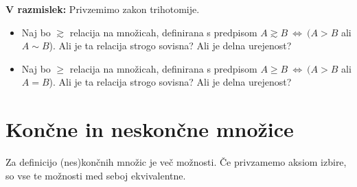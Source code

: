 \documentclass[11pt,paper=b5,footinclude,headinclude]{scrbook} %
\def\cee {{~\Leftrightarrow~}}
\begin{document}
\textbf{V razmislek:}
Privzemimo zakon trihotomije.
\begin{itemize}
    \item Naj bo $\gtrsim$ relacija na množicah, definirana s predpisom $A\gtrsim B\cee (A>B$ ali $A\sim B$).
     Ali je ta relacija strogo sovisna? Ali je delna urejenost?

    \item Naj bo $\ge$ relacija na množicah, definirana s predpisom $A\ge B\cee (A>B$ ali $A= B$).
     Ali je ta relacija strogo sovisna? Ali je delna urejenost?
\end{itemize}

\chapter{Končne in neskončne množice}

Za definicijo (nes)končnih množic je več možnosti. Če privzamemo aksiom izbire, so vse te možnosti med seboj ekvivalentne.
\end{document}
